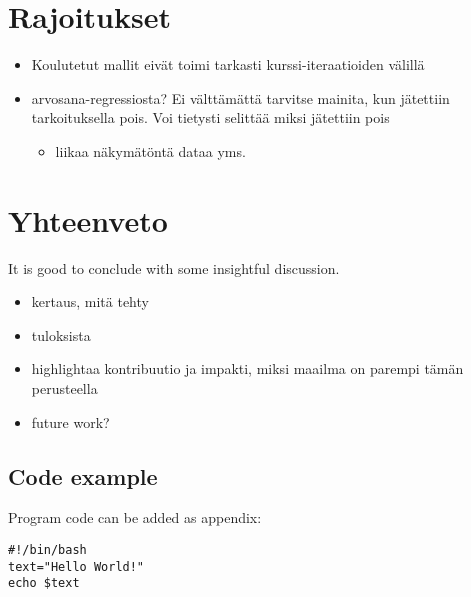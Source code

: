 \documentclass[finnish,twoside,openright]{HYgraduMLDS}
\begin{document}
\chapter{Rajoitukset}

\begin{itemize}
    \item Koulutetut mallit eivät toimi tarkasti kurssi-iteraatioiden välillä
    \item arvosana-regressiosta? Ei välttämättä tarvitse mainita, kun jätettiin tarkoituksella pois. Voi tietysti selittää miksi jätettiin pois
    \begin{itemize}
        \item liikaa näkymätöntä dataa yms.
    \end{itemize}
\end{itemize}

\chapter{Yhteenveto\label{chapter:Yhteenveto}}

It is good to conclude with some insightful discussion. 

\begin{itemize}
    \item kertaus, mitä tehty
    \item tuloksista
    \item highlightaa kontribuutio ja impakti, miksi maailma on parempi tämän perusteella
    \item future work?
\end{itemize}


\cleardoublepage %




\begin{appendices}
\myappendixtitle

\chapter{Code example\label{appendix:code}}
Program code can be added as appendix:
\begin{verbatim}
#!/bin/bash          
text="Hello World!"
echo $text
\end{verbatim}

\end{appendices}
\end{document}
